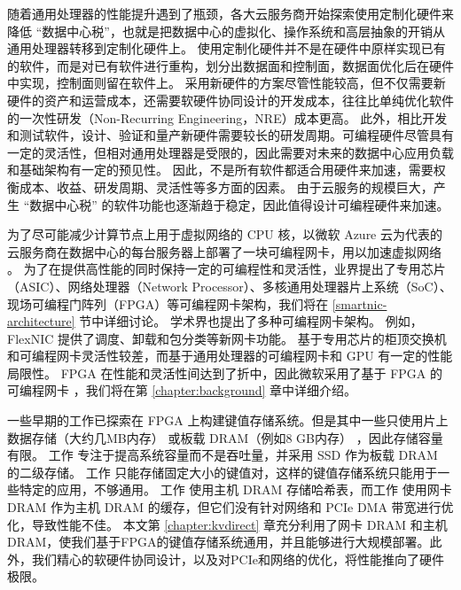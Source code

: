 随着通用处理器的性能提升遇到了瓶颈，各大云服务商开始探索使用定制化硬件来降低 ``数据中心税''，也就是把数据中心的虚拟化、操作系统和高层抽象的开销从通用处理器转移到定制化硬件上。
使用定制化硬件并不是在硬件中原样实现已有的软件，而是对已有软件进行重构，划分出数据面和控制面，数据面优化后在硬件中实现，控制面则留在软件上。
采用新硬件的方案尽管性能较高，但不仅需要新硬件的资产和运营成本，还需要软硬件协同设计的开发成本，往往比单纯优化软件的一次性研发（Non-Recurring Engineering，NRE）成本更高。
此外，相比开发和测试软件，设计、验证和量产新硬件需要较长的研发周期。可编程硬件尽管具有一定的灵活性，但相对通用处理器是受限的，因此需要对未来的数据中心应用负载和基础架构有一定的预见性。
因此，不是所有软件都适合用硬件来加速，需要权衡成本、收益、研发周期、灵活性等多方面的因素。
由于云服务的规模巨大，产生 ``数据中心税'' 的软件功能也逐渐趋于稳定，因此值得设计可编程硬件来加速。

为了尽可能减少计算节点上用于虚拟网络的 CPU 核，以微软 Azure 云为代表的云服务商在数据中心的每台服务器上部署了一块可编程网卡，用以加速虚拟网络 \cite{smartnic}。
为了在提供高性能的同时保持一定的可编程性和灵活性，业界提出了专用芯片（ASIC）、网络处理器（Network Processor）、多核通用处理器片上系统（SoC）、现场可编程门阵列（FPGA）等可编程网卡架构，我们将在 \ref{smartnic-architecture} 节中详细讨论。
学术界也提出了多种可编程网卡架构。
例如，FlexNIC \cite{kaufmann2016high} 提供了调度、卸载和包分类等新网卡功能。
基于专用芯片的柜顶交换机和可编程网卡灵活性较差，而基于通用处理器的可编程网卡和 GPU 有一定的性能局限性。
FPGA 在性能和灵活性间达到了折中，因此微软采用了基于 FPGA 的可编程网卡 \cite{putnam2014reconfigurable}，我们将在第 \ref{chapter:background} 章中详细介绍。

一些早期的工作已探索在 FPGA 上构建键值存储系统。但是其中一些只使用片上数据存储（大约几MB内存） \cite {liang16fpl} 或板载 DRAM（例如8 GB内存） \cite {istvan2013flexible,chalamalasetti2013fpga,istvan2015hash}，因此存储容量有限。
工作 \cite {blott2015scaling} 专注于提高系统容量而不是吞吐量，并采用 SSD 作为板载 DRAM 的二级存储。
工作 \cite {liang16fpl,chalamalasetti2013fpga} 只能存储固定大小的键值对，这样的键值存储系统只能用于一些特定的应用，不够通用。
工作 \cite {blott13hotcloud,lavasani2014fpga} 使用主机 DRAM 存储哈希表，而工作 \cite {tokusashi2016multilevel} 使用网卡 DRAM 作为主机 DRAM 的缓存，但它们没有针对网络和 PCIe DMA 带宽进行优化，导致性能不佳。
本文第 \ref{chapter:kvdirect} 章充分利用了网卡 DRAM 和主机 DRAM，使我们基于FPGA的键值存储系统通用，并且能够进行大规模部署。此外，我们精心的软硬件协同设计，以及对PCIe和网络的优化，将性能推向了硬件极限。




